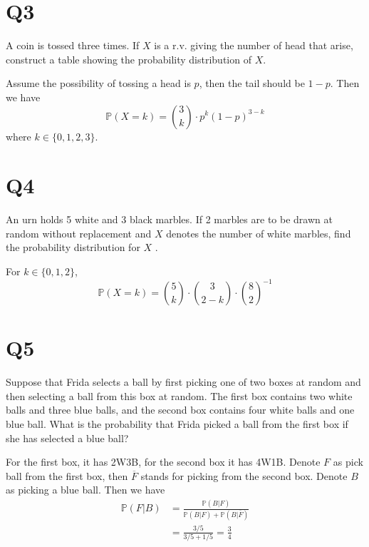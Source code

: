 \documentclass[11pt]{article}
\begin{document}
\section*{Q3}
A coin is tossed three times. If $X$ is a r.v. giving the number 
of head that arise, construct a table showing the probability distribution 
of $X$.
\begin{solution}
    Assume the possibility of tossing a head is $p$, then the 
    tail should be $1-p$. Then we have
\begin{equation*}
  \mathbb{P}(X=k)=\binom{3}{k}\cdot p^{k}(1-p)^{3-k}
\end{equation*}
where $k \in \{ 0,1,2,3 \}$.
\end{solution}


\section*{Q4}
An urn holds 5 white and 3 black marbles. If 2 marbles are to
be drawn at random without replacement and $X$ denotes the
number of white marbles, ﬁnd the probability distribution for
$X$ .
\begin{solution}
    For $k \in \{ 0,1,2 \}$,
    \begin{equation*}
      \mathbb{P}(X=k)=\binom{5}{k}\cdot \binom{3}{2-k}\cdot
      \binom{8}{2}^{-1}
    \end{equation*}
\end{solution}

\section*{Q5}
Suppose that Frida selects a ball by ﬁrst picking one of two
boxes at random and then selecting a ball from this box at
random. The ﬁrst box contains two white balls and three blue
balls, and the second box contains four white balls and one
blue ball. What is the probability that Frida picked a ball from
the ﬁrst box if she has selected a blue ball?
\begin{solution}
    For the first box, it has 2W3B, for the second box it has 4W1B.
    Denote $F$ as pick ball from the first box, then $\overline{F}$
    stands for picking from the second box. Denote $B$ as picking a 
    blue ball. Then we have 
    \begin{align*}
        \mathbb{P}(F \vert B)&=\frac{\mathbb{P}(B\vert F)}{\mathbb{P}(B \vert F)+\mathbb{P}(B \vert \overline{F})}\\
        &=\frac{3 / 5}{3 / 5+1 / 5}=\frac{3}{4}
    \end{align*}
\end{solution}
\end{document}

